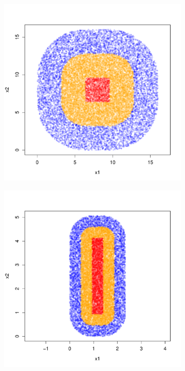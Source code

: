 \documentclass{article}
\newcommand{\1}{\mathbf{1}}
\theoremstyle{aldenthm}
\theoremstyle{aldenrmrk}
\begin{document}
\begin{figure}
	\centering
	\begin{adjustbox}{minipage=\linewidth,scale=0.8}
		\begin{subfigure}{.33\linewidth}
			\includegraphics[width=\linewidth]{example1plots/sample2}
			\caption{}
		\end{subfigure}
		\begin{subfigure}{.33\linewidth}
			\includegraphics[width=\linewidth]{example1plots/sample1}

\end{subfigure}
\end{adjustbox}
\end{figure}
\end{document}
